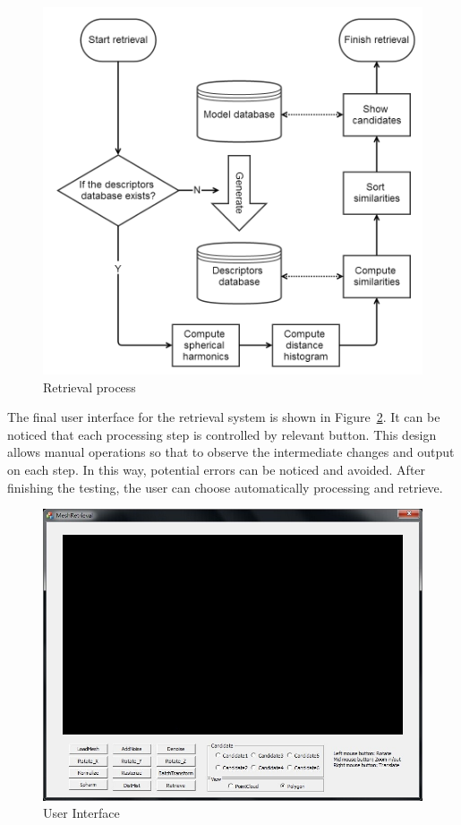 \begin{figure}[h]
\centering
\includegraphics[width=1\linewidth]{scan2search_main}
\caption{Retrieval process} \label{scan2search_main}
\end{figure}

The final user interface for the retrieval system is shown in Figure~\ref{UI}. It can be noticed that each processing step is controlled by relevant button. This design allows manual operations so that to observe the intermediate changes and output on each step. In this way, potential errors can be noticed and avoided. After finishing the testing, the user can choose automatically processing and retrieve.

\begin{figure}[h]
\centering
\includegraphics[width=0.7\linewidth]{UI}
\caption{User Interface} \label{UI}
\end{figure}

